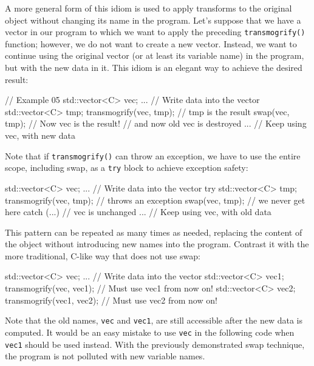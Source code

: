 A more general form of this idiom is used to apply transforms to the original object without changing its name in the program. Let's suppose that we have a vector in our program to which we want to apply the preceding \texttt{transmogrify()} function; however, we do not want to create a new vector. Instead, we want to continue using the original vector (or at least its variable name) in the program, but with the new data in it. This idiom is an elegant way to achieve the desired result:

\begin{code}
// Example 05
std::vector<C> vec;
...                     // Write data into the vector
{
  std::vector<C> tmp;
  transmogrify(vec, tmp);    // tmp is the result
  swap(vec, tmp);        // Now vec is the result!
}                    // and now old vec is destroyed
...                    // Keep using vec, with new data
\end{code}

Note that if \texttt{transmogrify()} can throw an exception, we have to use the entire scope, including swap, as a \texttt{try} block to achieve exception safety:

\begin{code}
std::vector<C> vec;
...                     // Write data into the vector
try {
  std::vector<C> tmp;
  transmogrify(vec, tmp);    // throws an exception
  swap(vec, tmp);        // we never get here
} catch (...) {}            // vec is unchanged
...                     // Keep using vec, with old data
\end{code}

This pattern can be repeated as many times as needed, replacing the content of the object without introducing new names into the program. Contrast it with the more traditional, C-like way that does not use swap:

\begin{code}
std::vector<C> vec;
...    // Write data into the vector std::vector<C> vec1;
transmogrify(vec, vec1);    // Must use vec1 from now on!
std::vector<C> vec2;
transmogrify(vec1, vec2);     // Must use vec2 from now on!
\end{code}

Note that the old names, \texttt{vec} and \texttt{vec1}, are still accessible after the new data is computed. It would be an easy mistake to use \texttt{vec} in the following code when \texttt{vec1} should be used instead. With the previously demonstrated swap technique, the program is not polluted with new variable names.

